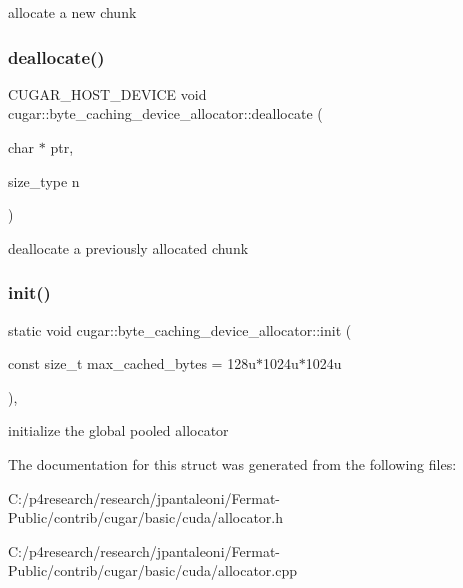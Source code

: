 allocate a new chunk \mbox{\label{structcugar_1_1byte__caching__device__allocator_af8abeecb89e6f5df9b2b625d1eee27ea}} 
\subsubsection{\texorpdfstring{deallocate()}{deallocate()}}
{\footnotesize\ttfamily C\+U\+G\+A\+R\+\_\+\+H\+O\+S\+T\+\_\+\+D\+E\+V\+I\+CE void cugar\+::byte\+\_\+caching\+\_\+device\+\_\+allocator\+::deallocate (\begin{DoxyParamCaption}\item[{char $\ast$}]{ptr,  }\item[{size\+\_\+type}]{n }\end{DoxyParamCaption})\hspace{0.3cm}{\ttfamily [inline]}}

deallocate a previously allocated chunk \mbox{\label{structcugar_1_1byte__caching__device__allocator_a9d2afe2f2942d71f1924aac1d13bcd03}} 
\subsubsection{\texorpdfstring{init()}{init()}}
{\footnotesize\ttfamily static void cugar\+::byte\+\_\+caching\+\_\+device\+\_\+allocator\+::init (\begin{DoxyParamCaption}\item[{const size\+\_\+t}]{max\+\_\+cached\+\_\+bytes = {\ttfamily 128u$\ast$1024u$\ast$1024u} }\end{DoxyParamCaption})\hspace{0.3cm}{\ttfamily [inline]}, {\ttfamily [static]}}

initialize the global pooled allocator 

The documentation for this struct was generated from the following files\+:\begin{DoxyCompactItemize}
\item 
C\+:/p4research/research/jpantaleoni/\+Fermat-\/\+Public/contrib/cugar/basic/cuda/allocator.\+h\item 
C\+:/p4research/research/jpantaleoni/\+Fermat-\/\+Public/contrib/cugar/basic/cuda/allocator.\+cpp\end{DoxyCompactItemize}
